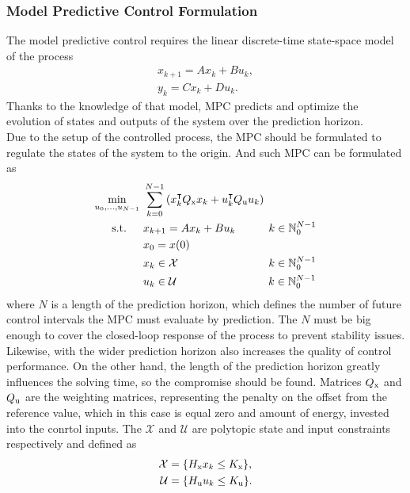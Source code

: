 \subsubsection{Model Predictive Control Formulation}
The model predictive control requires the linear discrete-time state-space model of the process
\begin{subequations}\label{linmodel}
	\begin{align}	
	x_{k+1} = Ax_k + Bu_k,\\
	y_k = Cx_k + Du_k.
	\end{align}
\end{subequations}
Thanks to the knowledge of that model, MPC predicts and optimize the evolution of states and outputs of the system over the prediction horizon.\\
Due to the setup of the controlled process, the MPC should be formulated to regulate the states of the system to the origin. And such MPC can be formulated as
\begin{subequations}\label{mpcgeneral}
	\begin{align}
		\min_{u_0,...,u_{N-1}}\ &\sum_{k=0}^{N-1} \left(  x_{k}^\intercal Q _{\text{x}}x_{k}+u_{k}^\intercal Q _{\text{u}}u_{k} \right)\\
	    \label{eq217b}\text{s.t.}\quad\,\ &x_{k+1} = Ax_{k} + Bu_{k}\qquad\quad  k \in \mathbb{N}_0^{N-1}\\
		&x_0 = x(0)\\
		\label{cst_x}&x_{k}\in\mathcal{X}\qquad\qquad\qquad\qquad\,  k \in \mathbb{N}_0^{N-1}\\
		\label{cst_u}&u_{k}\in\mathcal{U}\qquad\qquad\qquad\qquad\;   k \in \mathbb{N}_0^{N-1}
	\end{align}
\end{subequations}
where $N$ is a length of the prediction horizon, which defines the number of future control intervals the MPC must evaluate by prediction. The $N$ must be big enough to cover the closed-loop response of the process to prevent stability issues. Likewise, with the wider prediction horizon also increases the quality of control performance. On the other hand, the length of the prediction horizon greatly influences the solving time, so the compromise should be found. Matrices $Q _{\text{x}}$ and $Q _{\text{u}}$ are the weighting matrices, representing the penalty on the offset from the reference value, which in this case is equal zero and amount of energy, invested into the conrtol inputs. The $\mathcal{X}$ and $\mathcal{U}$ are polytopic state and input constraints respectively and defined as
\begin{subequations}
	\begin{align}
	\mathcal{X} &= \{H _{\text{x}}x_k\leq K _{\text{x}}\},\\
	\mathcal{U} &= \{H _{\text{u}}u_k\leq K _{\text{u}}\}.
	\end{align}
\end{subequations}
